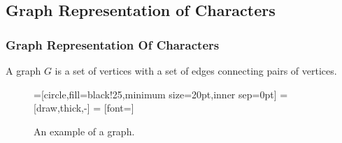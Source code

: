 \documentclass{beamer}
\begin{document}
            \subsection{Graph Representation of Characters}

                  \begin{frame}
                        \frametitle{Graph Representation Of Characters}
                        \begin{definition}[graph] \label{def:graph}
                              A graph $ G $ is a set of vertices with a set of edges connecting pairs of vertices.

                              \begin{figure}[h!]
                                    =[circle,fill=black!25,minimum size=20pt,inner sep=0pt]
                                     = [draw,thick,-]
                                     = [font=\small]
                                    \label{fig:graphDefinitionExample}
                                    \caption{An example of a graph.}
                              \end{figure}
                        \end{definition}
                  \end{frame}
\end{document}
